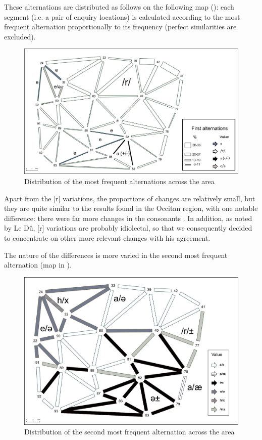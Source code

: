 \documentclass[output=paper]{LSP/langsci}
\begin{document}
These alternations are distributed as follows on the following map (): each segment (i.e. a pair of enquiry locations) is calculated according to the most frequent alternation proportionally to its frequency (perfect similarities are excluded).

  
\begin{figure}
\includegraphics[width=\textwidth]{illustrations/brun_etal_fig4}
\caption{Distribution of the most frequent alternations across the area}
\label{fig:4}
\end{figure}

Apart from the [r] variations, the proportions of changes are relatively small, but they are quite similar to the results found in the Occitan region, with one notable difference: there were far more changes in the consonants \cite[135]{brun-trigaud_usage_2014}. In addition, as noted by Le Dû, [r] variations are probably idiolectal, so that we consequently decided to concentrate on other more relevant changes with his agreement.

The nature of the differences is more varied in the second most frequent alternation (map in ).

\begin{figure}
\includegraphics[width=\textwidth]{illustrations/brun_etal_fig5}
\caption{\textup{Distribution of the second most frequent alternation across the area}}
\label{fig:5}
\end{figure}
\end{document}
